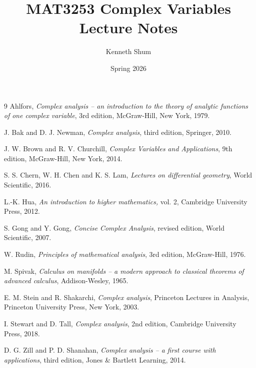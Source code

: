 \documentclass[11pt]{report}
\title{MAT3253 Complex Variables \\
	Lecture Notes}
\author{Kenneth Shum}
\date{Spring 2026}
\theoremstyle{definition}
\theoremstyle{remark}
\numberwithin{equation}{section}
\begin{document}
	\maketitle
	

	
	
	\tableofcontents

\smallskip


\begin{thebibliography}{9}
	 Ahlfors, \emph{Complex analysis -- an introduction to the theory of analytic functions of one complex variable}, 3rd edition, McGraw-Hill, New York, 1979.

	 J. Bak and D. J. Newman, \emph{Complex analysis},  third edition, Springer, 2010.


	 J. W. Brown and R. V. Churchill,  \emph{Complex Variables and Applications}, 9th edition, McGraw-Hill, New York, 2014.	


	 S. S. Chern, W. H. Chen and K. S. Lam, \emph{ Lectures on differential geometry}, World Scientific, 2016.
	
	 L.-K. Hua, \emph{An introduction to higher mathematics,} vol. 2, Cambridge University Press, 2012.

	 S. Gong and Y. Gong, \emph{Concise Complex Analysis},  revised edition, World Scientific, 2007.


	
	 W. Rudin,  \emph{Principles of mathematical analysis}, 3rd edition, McGraw-Hill, 1976.
	

	 M. Spivak, \emph{Calculus on manifolds -- a modern approach to classical theorems of advanced calculus}, Addison-Wesley, 1965.

	 E. M. Stein and R. Shakarchi,  \emph{Complex analysis}, Princeton Lectures in Analysis, Princeton University Press, New York, 2003.
	
	 I. Stewart and D. Tall, \emph{Complex analysis}, 2nd edition, Cambridge University Press, 2018.

	 D. G. Zill and P. D. Shanahan, \emph{Complex analysis -- a first course with applications}, third edition, Jones \& Bartlett Learning, 2014.
\end{thebibliography}
\end{document}
